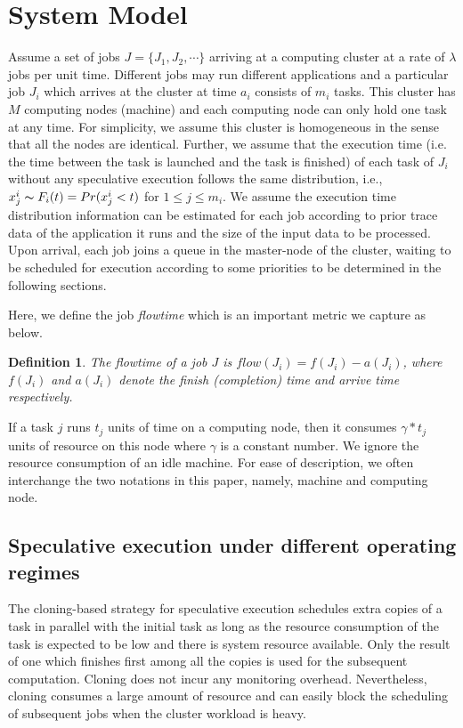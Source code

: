 \documentclass[10pt,conference]{IEEEtran}
\newtheorem{definition}{Definition}
\begin{document}
\section{System Model}
\label{system_model}
Assume a set of jobs  $J = \{J_1, J_2, \cdots\}$ arriving at a computing cluster at a rate of $\lambda$ jobs per unit time. Different jobs may run different applications and a particular job $J_i$ which arrives at the cluster at time $a_i$ consists of $m_i$ tasks. This cluster has $M$ computing nodes (machine) and each computing node can only hold one task at any time. For simplicity, we assume this cluster is homogeneous in the sense that all the nodes are identical. Further, we assume that the execution time (i.e. the time between the task is launched and the task is finished) of each task of $J_i$  without any speculative execution follows the same distribution, i.e., $x^i_j \thicksim F_i(t) = Pr(x^i_j < t)$ for $1 \leq  j \leq m_i$. We assume the execution time distribution information can be estimated for each job according to prior trace data of the application it runs and the size of the input data to be processed. Upon arrival, each job joins a queue in the master-node of the cluster, waiting to be scheduled for execution according to some priorities to be determined in the following sections.

Here, we define the job \textit{flowtime} which is an important metric we capture as below.
\begin{definition}
The \textit{flowtime} of a job $J$ is $flow(J_i)=f(J_i)-a(J_i)$, where $f(J_i)$ and $a(J_i)$ denote the finish (completion) time and arrive time respectively.
\end{definition}


If a task $j$ runs $t_j$ units of time on a computing node, then it consumes $\gamma*t_j$ units of resource on this node where $\gamma$ is a constant number. We ignore the resource consumption of an idle machine. For ease of description, we often interchange the two notations in this paper, namely, machine and computing node.

\subsection{Speculative execution under different operating regimes}
The cloning-based strategy for speculative execution schedules extra copies of a task in parallel with the initial task as long as the resource consumption of the task is expected to be low and there is system resource available. Only the result of one which finishes first among all the copies is used for the subsequent computation. Cloning does not incur any monitoring overhead. Nevertheless, cloning consumes a large amount of resource and can easily block the scheduling of subsequent jobs when the cluster workload is heavy.
\end{document}
